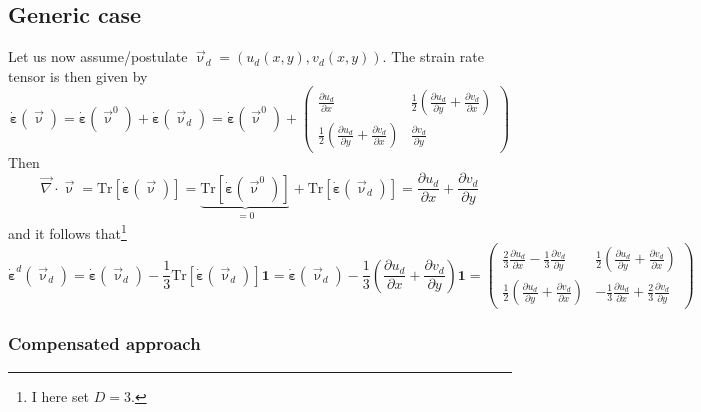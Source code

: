 \subsection*{Generic case}

Let us now assume/postulate $\vec{\upnu}_d=(u_d(x,y) , v_d(x,y))$.
The strain rate tensor is then given by 
\[
\dot{\bm \varepsilon}(\vec\upnu)
= \dot{\bm \varepsilon}(\vec\upnu^0)
+ \dot{\bm \varepsilon}(\vec\upnu_d)
= 
\dot{\bm \varepsilon}(\vec\upnu^0) + 
\begin{pmatrix}
\frac{\partial u_d}{\partial x} 
& \frac12 \left(  \frac{\partial u_d}{\partial y} + \frac{\partial v_d}{\partial x} \right)  \\
\frac12 \left(  \frac{\partial u_d}{\partial y} + \frac{\partial v_d}{\partial x} \right)  
& \frac{\partial v_d}{\partial y}
\end{pmatrix}
\]
Then 
\[
\vec\nabla \cdot \vec\upnu 
= \text{Tr}[\dot{\bm \varepsilon}(\vec\upnu)]
= \underbrace{\text{Tr}[\dot{\bm \varepsilon}(\vec\upnu^0)]}_{=0}
+ \text{Tr}[\dot{\bm \varepsilon}(\vec\upnu_d)]
= \frac{\partial u_d}{\partial x} + \frac{\partial v_d}{\partial y}
\]
and it follows that\footnote{I here set $D=3$.}
\[
\dot{\bm \varepsilon}^d(\vec\upnu_d)
=\dot{\bm \varepsilon}(\vec\upnu_d) - \frac{1}{3} \text{Tr}[\dot{\bm \varepsilon}(\vec\upnu_d)] {\bm 1}
=\dot{\bm \varepsilon}(\vec\upnu_d) - \frac{1}{3} \left( \frac{\partial u_d}{\partial x} + \frac{\partial v_d}{\partial y} \right)  {\bm 1}
=
\begin{pmatrix}
\frac23 \frac{\partial u_d}{\partial x} - \frac13 \frac{\partial v_d}{\partial y} 
&  \frac12 \left(  \frac{\partial u_d}{\partial y} + \frac{\partial v_d}{\partial x} \right)  \\
\frac12 \left(  \frac{\partial u_d}{\partial y} + \frac{\partial v_d}{\partial x} \right)  
& -\frac13 \frac{\partial u_d}{\partial x} + \frac23 \frac{\partial v_d}{\partial y}
\end{pmatrix}
\]

%
\subsubsection*{Compensated approach}

